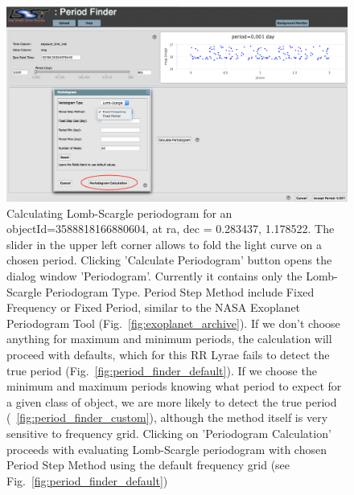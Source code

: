 \documentclass[DM,lsstdraft,toc]{lsstdoc}
\begin{document}
\begin{figure}
\includegraphics[width=\textwidth]{figs/Period_finder_initial}
\caption{Calculating Lomb-Scargle periodogram for an objectId=3588818166880604, at ra, dec = 0.283437\degree, 1.178522\degree. The slider in the upper left corner allows to fold the light curve on a chosen period. Clicking 'Calculate Periodogram' button opens the dialog window 'Periodogram'. Currently it contains only the Lomb-Scargle Periodogram Type. Period Step Method include Fixed Frequency or Fixed Period, similar to the NASA Exoplanet Periodogram Tool (Fig.~\ref{fig:exoplanet_archive}). If we don't choose anything for maximum and minimum periods, the calculation will proceed with defaults, which for this RR Lyrae fails to detect the true period (Fig.~\ref{fig:period_finder_default}). If we choose the minimum and maximum periods knowing what period to expect for a given class of object, we are more likely to detect the true period (~\ref{fig:period_finder_custom}), although the method itself is very sensitive to frequency grid. Clicking on 'Periodogram Calculation' proceeds with evaluating Lomb-Scargle periodogram with chosen Period Step Method using the default frequency grid (see Fig.~\ref{fig:period_finder_default}) }
\label{fig:period_finder_initial}
\end{figure}
\end{document}

